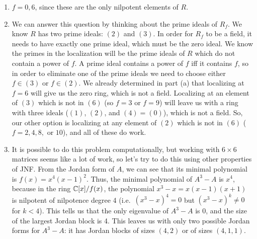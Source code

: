 \begin{solution}
\begin{enumerate}
    \item $f = 0,6$, since these are the only nilpotent elements of $R$.
    \item We can answer this question by thinking about the prime ideals of $R_f$. We know $R$ has two prime ideals: $(2)$ and $(3)$. In order for $R_f$ to be a field, it needs to have exactly one prime ideal, which must be the zero ideal. We know the primes in the localization will be the prime ideals of $R$ which do not contain a power of $f$. A prime ideal contains a power of $f$ iff it contains $f$, so in order to eliminate one of the prime ideals we need to choose either $f \in (3)$ or $f \in (2)$. We already determined in part (a) that localizing at $f = 6$ will give us the zero ring, which is not a field. Localizing at an element of $(3)$ which is not in $(6)$ (so $f = 3$ or $f = 9$) will leave us with a ring with three ideals ($(1)$, $(2)$, and $(4) = (0)$), which is not a field. So, our other option is localizing at any element of $(2)$ which is not in $(6)$ ($f = 2,4,8,$ or $10$), and all of these do work.
    \item It is possible to do this problem computationally, but working with $6 \times 6$ matrices seems like a lot of work, so let's try to do this using other properties of JNF. From the Jordan form of $A$, we can see that its minimal polynomial is $f(x) = x^4(x-1)^2$. Thus, the minimal polynomial of $A^3-A$ is $x^4$, because in the ring $\mathbb{C}[x]/f(x)$, the polynomial $x^3-x = x(x-1)(x+1)$ is nilpotent of nilpotence degree 4 (i.e.\ $(x^3-x)^4 = 0$ but $(x^3-x)^k \neq 0$ for $k < 4$). This tells us that the only eigenvalue of $A^3-A$ is 0, and the size of the largest Jordan block is 4. This leaves us with only two possible Jordan forms for $A^3-A$: it has Jordan blocks of sizes $(4,2)$ or of sizes $(4,1,1)$.
    

\end{enumerate}
\end{solution}
